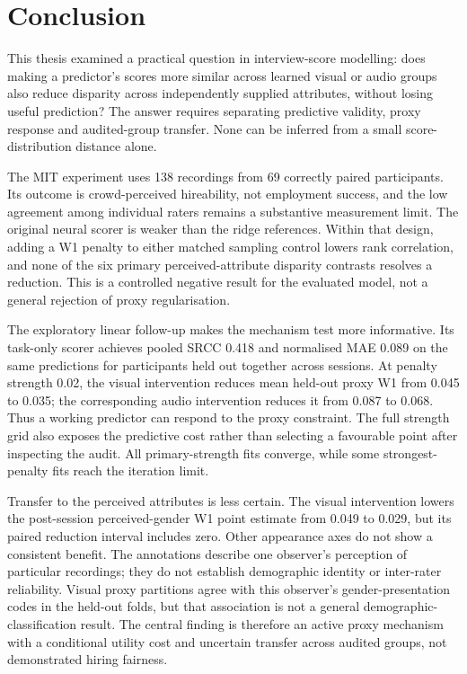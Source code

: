 \chapter{Conclusion}
\label{ch:conclusion}

This thesis examined a practical question in interview-score modelling: does making a
predictor's scores more similar across learned visual or audio groups also reduce
disparity across independently supplied attributes, without losing useful prediction?
The answer requires separating predictive validity, proxy response and audited-group
transfer. None can be inferred from a small score-distribution distance alone.

The MIT experiment uses 138 recordings from 69 correctly paired participants. Its
outcome is crowd-perceived hireability, not employment success, and the low agreement
among individual raters remains a substantive measurement limit. The original neural
scorer is weaker than the ridge references. Within that design, adding a W1 penalty
to either matched sampling control lowers rank correlation, and none of the six
primary perceived-attribute disparity contrasts resolves a reduction. This is a
controlled negative result for the evaluated model, not a general rejection of proxy
regularisation.

The exploratory linear follow-up makes the mechanism test more informative. Its
task-only scorer achieves pooled SRCC 0.418 and normalised MAE 0.089 on the same
predictions for participants held out together across sessions. At penalty strength 0.02, the visual intervention
reduces mean held-out proxy W1 from 0.045 to 0.035; the corresponding audio intervention
reduces it from 0.087 to 0.068. Thus a working predictor can respond to the proxy
constraint. The full strength grid also exposes the predictive cost rather than
selecting a favourable point after inspecting the audit. All primary-strength fits
converge, while some strongest-penalty fits reach the iteration limit.

Transfer to the perceived attributes is less certain. The visual intervention lowers
the post-session perceived-gender W1 point estimate from 0.049 to 0.029, but its
paired reduction interval includes zero. Other appearance axes do not show a consistent
benefit. The annotations describe one observer's perception of particular recordings;
they do not establish demographic identity or inter-rater reliability. Visual proxy
partitions agree with this observer's gender-presentation codes in the held-out folds,
but that association is not a general demographic-classification result. The central
finding is therefore an active proxy mechanism with a conditional utility cost and
uncertain transfer across audited groups, not demonstrated hiring fairness.

